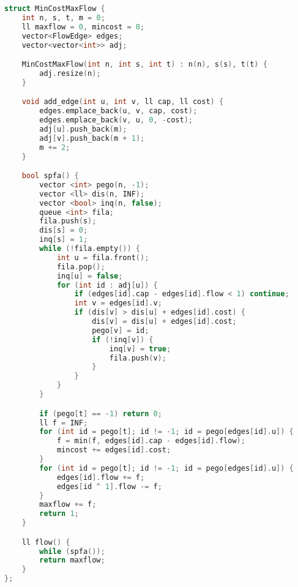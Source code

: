 \documentclass[11pt, a4paper, twoside]{article}
\begin{document}
\begin{lstlisting}[language=C++]
struct MinCostMaxFlow {
    int n, s, t, m = 0;
    ll maxflow = 0, mincost = 0;
    vector<FlowEdge> edges;
    vector<vector<int>> adj;

    MinCostMaxFlow(int n, int s, int t) : n(n), s(s), t(t) {
        adj.resize(n);
    }

    void add_edge(int u, int v, ll cap, ll cost) {
        edges.emplace_back(u, v, cap, cost);
        edges.emplace_back(v, u, 0, -cost);
        adj[u].push_back(m);
        adj[v].push_back(m + 1);
        m += 2;
    }

    bool spfa() {
        vector <int> pego(n, -1);
        vector <ll> dis(n, INF);
        vector <bool> inq(n, false);
        queue <int> fila;
        fila.push(s);
        dis[s] = 0;
        inq[s] = 1;
        while (!fila.empty()) {
            int u = fila.front();
            fila.pop();
            inq[u] = false;
            for (int id : adj[u]) {
                if (edges[id].cap - edges[id].flow < 1) continue;
                int v = edges[id].v;
                if (dis[v] > dis[u] + edges[id].cost) {
                    dis[v] = dis[u] + edges[id].cost;
                    pego[v] = id;
                    if (!inq[v]) {
                        inq[v] = true;
                        fila.push(v);
                    }
                }
            }
        }

        if (pego[t] == -1) return 0;
        ll f = INF;
        for (int id = pego[t]; id != -1; id = pego[edges[id].u]) {
            f = min(f, edges[id].cap - edges[id].flow);
            mincost += edges[id].cost;
        }
        for (int id = pego[t]; id != -1; id = pego[edges[id].u]) {
            edges[id].flow += f;
            edges[id ^ 1].flow -= f;
        }
        maxflow += f;
        return 1;
    }

    ll flow() {
        while (spfa());
        return maxflow;
    }
};
\end{lstlisting}
\end{document}
